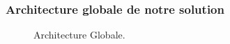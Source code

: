 	\subsubsection{Architecture globale de notre solution}
			\begin{figure}[H]
					\centering
					
					\label{fig:archi}
				\caption{Architecture Globale.}
			\end{figure}
